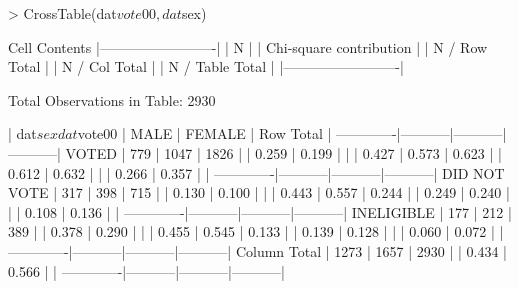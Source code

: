 \begin{Schunk}
\begin{Sinput}
>  CrossTable(dat$vote00 ,dat$sex) 
\end{Sinput}
\begin{Soutput}
   Cell Contents
|-------------------------|
|                       N |
| Chi-square contribution |
|           N / Row Total |
|           N / Col Total |
|         N / Table Total |
|-------------------------|

 
Total Observations in Table:  2930 

 
             | dat$sex 
  dat$vote00 |      MALE |    FEMALE | Row Total | 
-------------|-----------|-----------|-----------|
       VOTED |       779 |      1047 |      1826 | 
             |     0.259 |     0.199 |           | 
             |     0.427 |     0.573 |     0.623 | 
             |     0.612 |     0.632 |           | 
             |     0.266 |     0.357 |           | 
-------------|-----------|-----------|-----------|
DID NOT VOTE |       317 |       398 |       715 | 
             |     0.130 |     0.100 |           | 
             |     0.443 |     0.557 |     0.244 | 
             |     0.249 |     0.240 |           | 
             |     0.108 |     0.136 |           | 
-------------|-----------|-----------|-----------|
  INELIGIBLE |       177 |       212 |       389 | 
             |     0.378 |     0.290 |           | 
             |     0.455 |     0.545 |     0.133 | 
             |     0.139 |     0.128 |           | 
             |     0.060 |     0.072 |           | 
-------------|-----------|-----------|-----------|
Column Total |      1273 |      1657 |      2930 | 
             |     0.434 |     0.566 |           | 
-------------|-----------|-----------|-----------|
\end{Soutput}
\end{Schunk}
